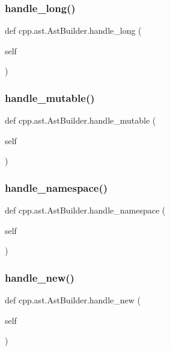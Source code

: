 \subsubsection{\texorpdfstring{handle\_long()}{handle\_long()}}
{\footnotesize\ttfamily def cpp.\+ast.\+Ast\+Builder.\+handle\+\_\+long (\begin{DoxyParamCaption}\item[{}]{self }\end{DoxyParamCaption})}

\mbox{\label{classcpp_1_1ast_1_1AstBuilder_a6a642353cfe2cddd1a60cbb1011df787}} 
\subsubsection{\texorpdfstring{handle\_mutable()}{handle\_mutable()}}
{\footnotesize\ttfamily def cpp.\+ast.\+Ast\+Builder.\+handle\+\_\+mutable (\begin{DoxyParamCaption}\item[{}]{self }\end{DoxyParamCaption})}

\mbox{\label{classcpp_1_1ast_1_1AstBuilder_ae6dde01c5f9ac7ba3b14dff01cac66e4}} 
\subsubsection{\texorpdfstring{handle\_namespace()}{handle\_namespace()}}
{\footnotesize\ttfamily def cpp.\+ast.\+Ast\+Builder.\+handle\+\_\+namespace (\begin{DoxyParamCaption}\item[{}]{self }\end{DoxyParamCaption})}

\mbox{\label{classcpp_1_1ast_1_1AstBuilder_a86f5769e0460524691ae0d135d30f101}} 
\subsubsection{\texorpdfstring{handle\_new()}{handle\_new()}}
{\footnotesize\ttfamily def cpp.\+ast.\+Ast\+Builder.\+handle\+\_\+new (\begin{DoxyParamCaption}\item[{}]{self }\end{DoxyParamCaption})}

